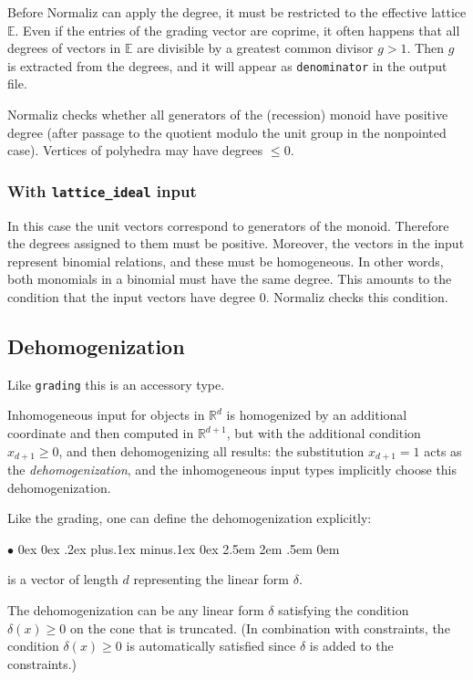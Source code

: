 \documentclass[12pt,a4paper]{scrartcl}
\newcommand{\stdli}{ \topsep0ex \partopsep0ex %
\parsep.2ex plus.1ex minus.1ex \itemsep0ex%
\leftmargin2.5em \labelwidth2em \labelsep.5em \rightmargin0em}%
\renewenvironment{itemize}{\begin{list}{{$\bullet$}}{\stdli}}{\end{list}}
\theoremstyle{definition}
\def\RR{{\mathbb R}}
\def\EE{{\mathbb E}}
\def\itemtt[#1]{\item[\textbf{\ttt{#1}}]}
\def\ttt{\texttt}
\begin{document}
Before Normaliz can apply the degree, it must be restricted
to the effective lattice $\EE$. Even if the entries of the
grading vector are coprime, it often happens that all degrees
of vectors in $\EE$ are divisible by a greatest common divisor
$ g>1$. Then $g$ is extracted from the degrees, and it will
appear as \ttt{denominator} in the output file.

Normaliz checks whether all generators of the (recession) monoid have
positive degree (after passage to the quotient modulo the unit group in the nonpointed case).
Vertices of polyhedra may have degrees $\le 0$.

\subsubsection{With \ttt{lattice\_ideal} input}\label{grad_lattid}

In this case the unit vectors correspond to generators of the
monoid. Therefore the degrees assigned to them must be
positive. Moreover, the vectors in the input represent binomial
relations, and these must be homogeneous. In other words, both
monomials in a binomial must have the same degree. This amounts
to the condition that the input vectors have degree $0$.
Normaliz checks this condition.

\subsection{Dehomogenization}

Like \verb|grading| this is an accessory type.

Inhomogeneous input for objects in $\RR^d$ is homogenized by an additional coordinate and then computed in $\RR^{d+1}$, but with the additional condition $x_{d+1}\ge 0$, and then dehomogenizing all results: the substitution $x_{d+1}=1$ acts as the \emph{dehomogenization}, and the inhomogeneous input types implicitly choose this dehomogenization.

Like the grading, one can define the dehomogenization explicitly:
\begin{itemize}
	\itemtt[dehomogenization] is a vector of length $d$ representing the linear form $\delta$.
\end{itemize}

The dehomogenization can be any linear form $\delta$ satisfying the condition $\delta(x)\ge 0$ on the cone that is truncated. (In combination with constraints, the condition $\delta(x)\ge 0$ is automatically satisfied since $\delta$ is added to the constraints.)
\end{document}
